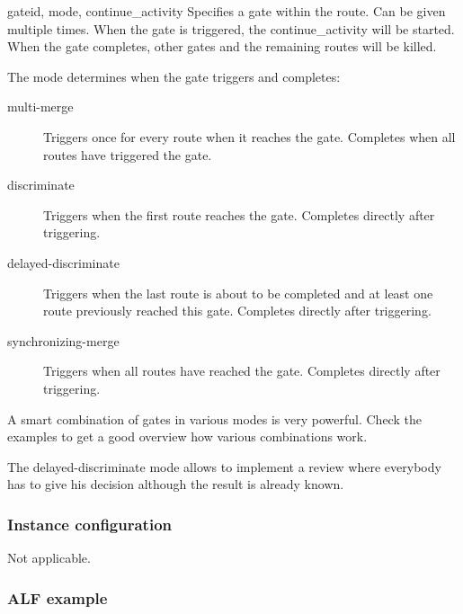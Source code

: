 \begin{funcdesc}{gate}{id, mode, continue\_activity}
    Specifies a gate within the route. Can be given multiple times. When the
    gate is triggered, the continue\_activity will be started. When the gate
    completes, other gates and the remaining routes will be killed.

    The mode determines when the gate triggers and completes:

    \begin{description}

        \item[multi-merge] Triggers once for every route when it reaches the
        gate. Completes when all routes have triggered the gate.

        \item[discriminate] Triggers when the first route reaches the gate.
        Completes directly after triggering.

        \item[delayed-discriminate] Triggers when the last route is about to be
        completed and at least one route previously reached this gate.
        Completes directly after triggering.

        \item[synchronizing-merge] Triggers when all routes have reached the
        gate. Completes directly after triggering.

    \end{description}
\end{funcdesc}

\begin{notice}
    A smart combination of gates in various modes is very powerful.  Check the
    examples to get a good overview how various combinations work.
\end{notice}

\begin{notice}
    The delayed-discriminate mode allows to implement a review where everybody
    has to give his decision although the result is already known.
\end{notice}

\subsubsection{Instance configuration}

Not applicable.

\subsubsection{ALF example}

